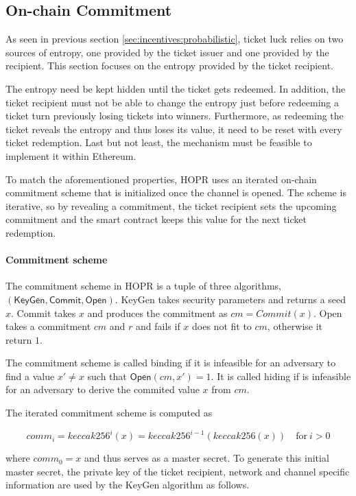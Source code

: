 \subsection{On-chain Commitment}
\label{sec:incentives:commitment}

As seen in previous section \ref{sec:incentives:probabilistic}, ticket luck relies on two sources of entropy, one provided by the ticket issuer and one provided by the recipient. This section focuses on the entropy provided by the ticket recipient.

The entropy need be kept hidden until the ticket gets redeemed. In addition, the ticket recipient must not be able to change the entropy just before redeeming a ticket turn previously losing tickets into winners. Furthermore, as redeeming the ticket reveals the entropy and thus loses its value, it need to be reset with every ticket redemption. Last but not least, the mechanism must be feasible to implement it within Ethereum.

To match the aforementioned properties, HOPR uses an iterated on-chain commitment scheme that is initialized once the channel is opened. The scheme is iterative, so by revealing a commitment, the ticket recipient sets the upcoming commitment and the smart contract keeps this value for the next ticket redemption.

\paragraph{Commitment scheme}
\label{sec:incentives:commitment:scheme}

The commitment scheme in HOPR is a tuple of three algorithms, $(\mathsf{KeyGen}, \mathsf{Commit}, \mathsf{Open})$. \textsf{KeyGen} takes security parameters and returns a seed $x$. \textsf{Commit} takes $x$ and produces the commitment as $ cm = Commit(x) $. \textsf{Open} takes a commitment $cm$ and $r$ and fails if $x$ does not fit to $cm$, otherwise it return $1$.

The commitment scheme is called binding if it is infeasible for an adversary to find a value $x' \ne x$ such that $\mathsf{Open}(cm, x') = 1$. It is called hiding if is infeasible for an adversary to derive the commited value $x$ from $cm$.

The iterated commitment scheme is computed as

$$ comm_i = keccak256 ^i (x) = keccak256 ^{i-1} (keccak256 (x)) \quad \text{for} \ i > 0$$

where $comm_0 = x$ and thus serves as a master secret.
To generate this initial master secret, the private key of the ticket recipient, network and channel specific information are used by the \textsf{KeyGen} algorithm as follows.

